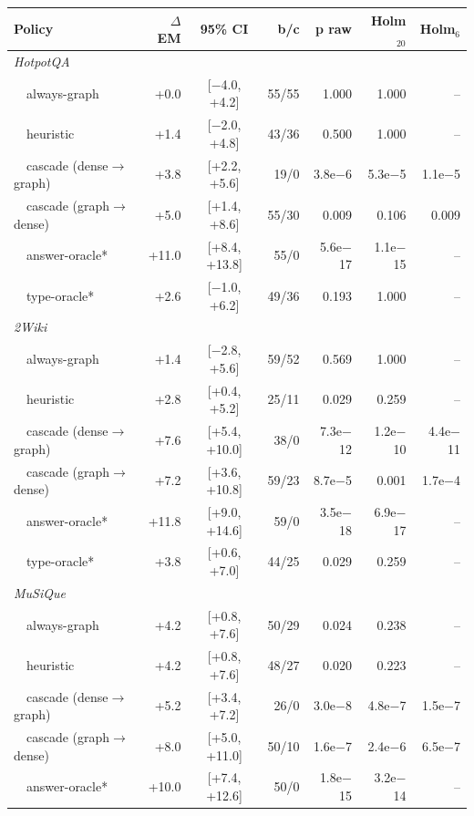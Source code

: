 \begin{tabular}{lrcrrrr}
\toprule
Policy & $\Delta$EM & 95\% CI & b/c & p raw & Holm$_{20}$ & Holm$_{6}$ \\
\midrule
\multicolumn{7}{l}{\emph{HotpotQA}} \\
~~always-graph & +0.0 & {[}$-$4.0, +4.2{]} & 55/55 & 1.000 & 1.000 & -- \\
~~heuristic & +1.4 & {[}$-$2.0, +4.8{]} & 43/36 & 0.500 & 1.000 & -- \\
~~cascade (dense$\rightarrow$graph) & +3.8 & {[}+2.2, +5.6{]} & 19/0 & 3.8e$-$6 & 5.3e$-$5 & 1.1e$-$5 \\
~~cascade (graph$\rightarrow$dense) & +5.0 & {[}+1.4, +8.6{]} & 55/30 & 0.009 & 0.106 & 0.009 \\
~~answer-oracle* & +11.0 & {[}+8.4, +13.8{]} & 55/0 & 5.6e$-$17 & 1.1e$-$15 & -- \\
~~type-oracle* & +2.6 & {[}$-$1.0, +6.2{]} & 49/36 & 0.193 & 1.000 & -- \\
\multicolumn{7}{l}{\emph{2Wiki}} \\
~~always-graph & +1.4 & {[}$-$2.8, +5.6{]} & 59/52 & 0.569 & 1.000 & -- \\
~~heuristic & +2.8 & {[}+0.4, +5.2{]} & 25/11 & 0.029 & 0.259 & -- \\
~~cascade (dense$\rightarrow$graph) & +7.6 & {[}+5.4, +10.0{]} & 38/0 & 7.3e$-$12 & 1.2e$-$10 & 4.4e$-$11 \\
~~cascade (graph$\rightarrow$dense) & +7.2 & {[}+3.6, +10.8{]} & 59/23 & 8.7e$-$5 & 0.001 & 1.7e$-$4 \\
~~answer-oracle* & +11.8 & {[}+9.0, +14.6{]} & 59/0 & 3.5e$-$18 & 6.9e$-$17 & -- \\
~~type-oracle* & +3.8 & {[}+0.6, +7.0{]} & 44/25 & 0.029 & 0.259 & -- \\
\multicolumn{7}{l}{\emph{MuSiQue}} \\
~~always-graph & +4.2 & {[}+0.8, +7.6{]} & 50/29 & 0.024 & 0.238 & -- \\
~~heuristic & +4.2 & {[}+0.8, +7.6{]} & 48/27 & 0.020 & 0.223 & -- \\
~~cascade (dense$\rightarrow$graph) & +5.2 & {[}+3.4, +7.2{]} & 26/0 & 3.0e$-$8 & 4.8e$-$7 & 1.5e$-$7 \\
~~cascade (graph$\rightarrow$dense) & +8.0 & {[}+5.0, +11.0{]} & 50/10 & 1.6e$-$7 & 2.4e$-$6 & 6.5e$-$7 \\
~~answer-oracle* & +10.0 & {[}+7.4, +12.6{]} & 50/0 & 1.8e$-$15 & 3.2e$-$14 & -- \\
\bottomrule
\end{tabular}